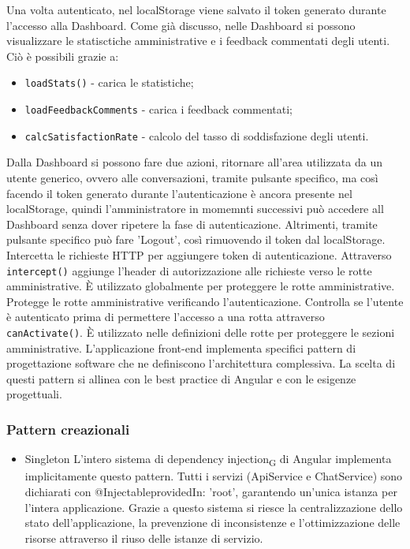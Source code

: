 Una volta autenticato, nel localStorage viene salvato il token generato durante l'accesso alla Dashboard.
Come già discusso, nelle Dashboard si possono visualizzare le statisctiche amministrative e i feedback commentati degli utenti. Ciò è possibili grazie a:
\begin{itemize}
    \item \texttt{loadStats()} - carica le statistiche;
    \item \texttt{loadFeedbackComments} - carica i feedback commentati;
    \item \texttt{calcSatisfactionRate} - calcolo del tasso di soddisfazione degli utenti. 
\end{itemize}
Dalla Dashboard si possono fare due azioni, ritornare all'area utilizzata da un utente generico, ovvero alle conversazioni, tramite pulsante specifico, ma così facendo il token generato durante l'autenticazione è ancora presente nel localStorage, quindi l'amministratore in momemnti successivi può accedere all Dashboard senza dover ripetere la fase di autenticazione. Altrimenti, tramite pulsante specifico può fare 'Logout', così rimuovendo il token dal localStorage.
Intercetta le richieste HTTP per aggiungere token di autenticazione. Attraverso \texttt{intercept()} aggiunge l'header di autorizzazione alle richieste verso le rotte amministrative. È utilizzato globalmente per proteggere le rotte amministrative.
Protegge le rotte amministrative verificando l'autenticazione. Controlla se l'utente è autenticato prima di permettere l'accesso a una rotta attraverso \texttt{canActivate()}. È utilizzato nelle definizioni delle rotte per proteggere le sezioni amministrative.
L'applicazione front-end implementa specifici pattern di progettazione software che ne definiscono l'architettura complessiva. La scelta di questi pattern si allinea con le best practice di Angular e con le esigenze progettuali.
\subsubsection*{Pattern creazionali}
\begin{itemize}
    \item Singleton
    \newline\newline L'intero sistema di dependency injection\textsubscript{G} di Angular implementa implicitamente questo pattern. Tutti i servizi (ApiService e ChatService) sono dichiarati con @Injectable{providedIn: 'root'}, garantendo un'unica istanza per l'intera applicazione. Grazie a questo sistema si riesce la centralizzazione dello stato dell'applicazione, la prevenzione di inconsistenze e l'ottimizzazione delle risorse attraverso il riuso delle istanze di servizio. 
\end{itemize}
